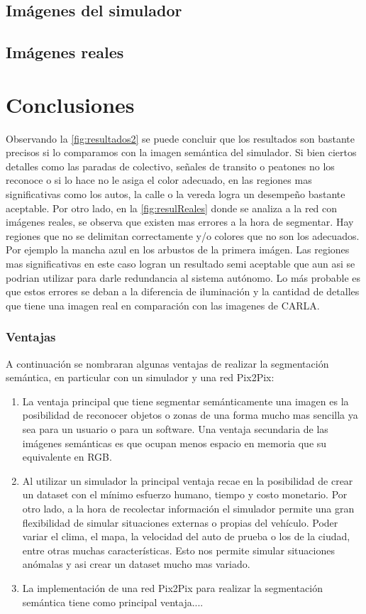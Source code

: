 \documentclass[]{IEEEtran}
\begin{document}
    \subsection{Imágenes del simulador}


    \subsection{Imágenes reales}




    \section{Conclusiones}
    Observando la \ref{fig:resultados2} se puede concluir que los resultados son bastante precisos si lo comparamos con la
    imagen semántica del simulador. Si bien ciertos detalles como las paradas de colectivo, señales de transito o peatones no los 
    reconoce o si lo hace no le asiga el color adecuado, en las regiones mas significativas como los autos, la calle o la vereda 
    logra un desempeño bastante aceptable. Por otro lado, en la \ref{fig:resulReales} donde se analiza a la red con imágenes reales,
    se observa que existen mas errores a la hora de segmentar. Hay regiones que no se delimitan correctamente y/o colores que no son 
    los adecuados. Por ejemplo la mancha azul en los arbustos de la primera imágen. Las regiones mas significativas en este caso logran un 
    resultado semi aceptable que aun asi se podrian utilizar para darle redundancia al sistema autónomo. Lo más probable es que estos 
    errores se deban a la diferencia de iluminación y la cantidad de detalles que tiene una imagen real en comparación con las imagenes 
    de CARLA.
    \subsubsection{Ventajas}
    A continuación se nombraran algunas ventajas de realizar la segmentación semántica, en particular con un simulador y una red Pix2Pix:
    \begin{enumerate}
        \item La ventaja principal que tiene segmentar semánticamente una imagen es la posibilidad de reconocer objetos o zonas de una forma
        mucho mas sencilla ya sea para un usuario o para un software. Una ventaja secundaria de las imágenes semánticas es que ocupan menos espacio 
        en memoria que su equivalente en RGB.
        \item Al utilizar un simulador la principal ventaja recae en la posibilidad de crear un dataset con el mínimo esfuerzo humano, tiempo y costo monetario.
        Por otro lado, a la hora de recolectar información el simulador permite una gran flexibilidad de simular situaciones externas o propias del
        vehículo. Poder variar el clima, el mapa, la velocidad del auto de prueba o los de la ciudad, entre otras muchas características. Esto nos permite 
        simular situaciones anómalas y asi crear un dataset mucho mas variado. 
        \item La implementación de una red Pix2Pix para realizar la segmentación semántica tiene como principal ventaja....
    \end{enumerate}
\end{document}
